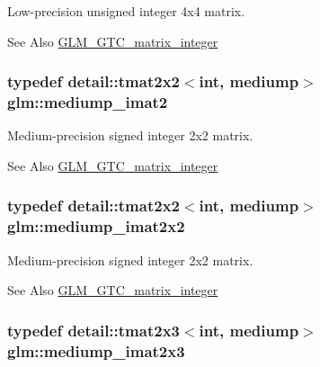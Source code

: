 Low-\/precision unsigned integer 4x4 matrix. \begin{DoxySeeAlso}{See Also}
\hyperlink{group__gtc__matrix__integer}{G\-L\-M\-\_\-\-G\-T\-C\-\_\-matrix\-\_\-integer} 
\end{DoxySeeAlso}
\hypertarget{group__gtc__matrix__integer_gaec03a8eef2ec2536f8bebffd0bac8192}{
\subsubsection[{mediump\-\_\-imat2}]{\setlength{\rightskip}{0pt plus 5cm}typedef detail\-::tmat2x2$<$int, mediump$>$ {\bf glm\-::mediump\-\_\-imat2}}}\label{group__gtc__matrix__integer_gaec03a8eef2ec2536f8bebffd0bac8192}
Medium-\/precision signed integer 2x2 matrix. \begin{DoxySeeAlso}{See Also}
\hyperlink{group__gtc__matrix__integer}{G\-L\-M\-\_\-\-G\-T\-C\-\_\-matrix\-\_\-integer} 
\end{DoxySeeAlso}
\hypertarget{group__gtc__matrix__integer_ga472222f6e3754124ee9cb64acaaedac1}{
\subsubsection[{mediump\-\_\-imat2x2}]{\setlength{\rightskip}{0pt plus 5cm}typedef detail\-::tmat2x2$<$int, mediump$>$ {\bf glm\-::mediump\-\_\-imat2x2}}}\label{group__gtc__matrix__integer_ga472222f6e3754124ee9cb64acaaedac1}
Medium-\/precision signed integer 2x2 matrix. \begin{DoxySeeAlso}{See Also}
\hyperlink{group__gtc__matrix__integer}{G\-L\-M\-\_\-\-G\-T\-C\-\_\-matrix\-\_\-integer} 
\end{DoxySeeAlso}
\hypertarget{group__gtc__matrix__integer_gabc92c714c2d257213c5b0771669df177}{
\subsubsection[{mediump\-\_\-imat2x3}]{\setlength{\rightskip}{0pt plus 5cm}typedef detail\-::tmat2x3$<$int, mediump$>$ {\bf glm\-::mediump\-\_\-imat2x3}}}\label{group__gtc__matrix__integer_gabc92c714c2d257213c5b0771669df177}
